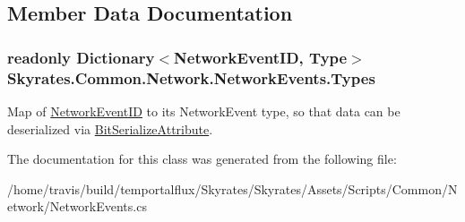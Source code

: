 \subsection{Member Data Documentation}
\hypertarget{class_skyrates_1_1_common_1_1_network_1_1_network_events_a9360ac6e13813aa04c2f77c18fea5274}{
\subsubsection[{Types}]{\setlength{\rightskip}{0pt plus 5cm}readonly Dictionary$<${\bf Network\-Event\-I\-D}, Type$>$ Skyrates.\-Common.\-Network.\-Network\-Events.\-Types}}\label{class_skyrates_1_1_common_1_1_network_1_1_network_events_a9360ac6e13813aa04c2f77c18fea5274}


Map of \hyperlink{namespace_skyrates_1_1_common_1_1_network_a90fc6faa44c44b4284114e861d3e761a}{Network\-Event\-I\-D} to its Network\-Event type, so that data can be deserialized via \hyperlink{class_skyrates_1_1_common_1_1_network_1_1_bit_serialize_attribute}{Bit\-Serialize\-Attribute}. 



The documentation for this class was generated from the following file\-:\begin{DoxyCompactItemize}
\item 
/home/travis/build/temportalflux/\-Skyrates/\-Skyrates/\-Assets/\-Scripts/\-Common/\-Network/Network\-Events.\-cs\end{DoxyCompactItemize}
